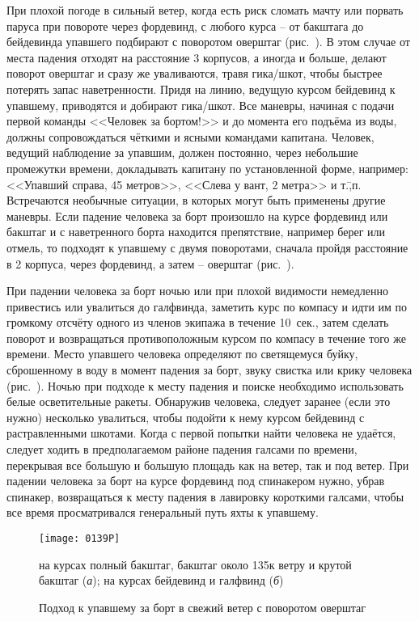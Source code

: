 При плохой погоде в сильный ветер, когда есть риск сломать мачту или порвать паруса при повороте через фордевинд, с любого курса \--- от бакштага до бейдевинда упавшего подбирают с поворотом оверштаг (рис.~). В этом случае от места падения отходят на расстояние 3 корпусов, а иногда и больше, делают поворот оверштаг и сразу же уваливаются, травя гика\-/шкот, чтобы быстрее потерять запас наветренности. Придя на линию, ведущую курсом бейдевинд к упавшему, приводятся и добирают гика\-/шкот. Все маневры, начиная с подачи первой команды <<Человек за бортом!>> и до момента его подъёма из воды, должны сопровождаться чёткими и ясными командами капитана. Человек, ведущий наблюдение за упавшим, должен постоянно, через небольшие промежутки времени, докладывать капитану по установленной форме, например: <<Упавший справа, 45 метров>>, <<Слева у вант, 2 метра>> и т.\=,п. Встречаются необычные ситуации, в которых могут быть применены другие маневры. Если падение человека за борт произошло на курсе фордевинд или бакштаг и с наветренного борта находится препятствие, например берег или отмель, то подходят к упавшему с двумя поворотами, сначала пройдя расстояние в 2 корпуса, через фордевинд, а затем \--- оверштаг (рис.~).

При падении человека за борт ночью или при плохой видимости немедленно привестись или увалиться до галфвинда, заметить курс по компасу и идти им по громкому отсчёту одного из членов экипажа в течение 10~сек., затем сделать поворот и возвращаться противоположным курсом по компасу в течение того же времени. Место упавшего человека определяют по светящемуся буйку, сброшенному в воду в момент падения за борт, звуку свистка или крику человека (рис.~). Ночью при подходе к месту падения и поиске необходимо использовать белые осветительные ракеты. Обнаружив человека, следует заранее (если это нужно) несколько увалиться, чтобы подойти к нему курсом бейдевинд с растравленными шкотами. Когда с первой попытки найти человека не удаётся, следует ходить в предполагаемом районе падения галсами по времени, перекрывая все большую и большую площадь как на ветер, так и под ветер. При падении человека за борт на курсе фордевинд под спинакером нужно, убрав спинакер, возвращаться к месту падения в лавировку короткими галсами, чтобы все время просматривался генеральный путь яхты к упавшему.

\begin{figure*}[htb]
  \centering{}
  \texttt{[image: 0139P]}
  \caption{Подход к упавшему за борт в свежий ветер с поворотом оверштаг}
  \label{fig:139}
  \small
  \centering{}
  на курсах полный бакштаг, бакштаг около 135\gr к ветру и крутой бакштаг (\textit{а}); на курсах бейдевинд и галфвинд (\textit{б})
\end{figure*}

